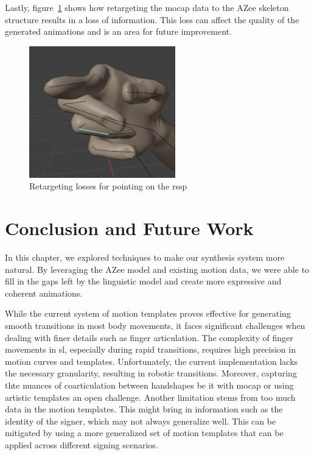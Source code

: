 \documentclass[../../main.tex]{subfiles}
\begin{document}
Lastly, figure~\ref{fig:losses} shows how retargeting the \gls{mocap} data to the AZee skeleton structure results in a loss of information. This loss can affect the quality of the generated animations and is an area for future improvement.

\begin{figure}
  \centering \includegraphics[width = 2.5in]{chapters/intermediate_blocks_pose_correction/images/losses.png}
  \caption{Retargeting losses for pointing on the \gls{rssp}}
  \label{fig:losses}
\end{figure}

\section{Conclusion and Future Work}
\label{ch:intermediate_blocks_pose_correction:conclusion_and_future_work}

In this chapter, we explored techniques to make our synthesis system more natural. By leveraging the AZee model and existing motion data, we were able to fill in the gaps left by the linguistic model and create more expressive and coherent animations. 

While the current system of motion templates proves effective for generating smooth transitions in most body movements, it faces significant challenges when dealing with finer details such as finger articulation. The complexity of finger movements in \gls{sl}, especially during rapid transitions, requires high precision in motion curves and templates. Unfortunately, the current implementation lacks the necessary granularity, resulting in robotic transitions. Moreover, capturing thte nuances of coarticulation between handshapes be it with \gls{mocap} or using artistic templates an open challenge. Another limitation stems from too much data in the motion templates. This might bring in information such as the identity of the signer, which may not always generalize well. This can be mitigated by using a more generalized set of motion templates that can be applied across different signing scenarios.
\end{document}
